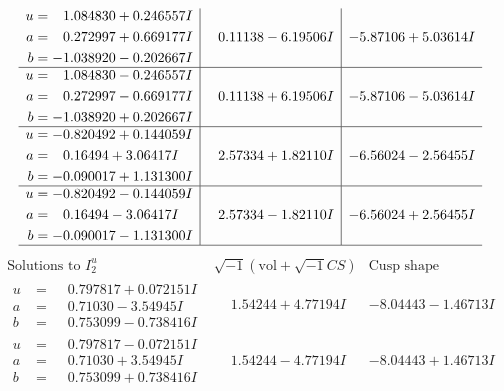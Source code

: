 \documentclass[1p]{elsarticle_modified}
\theoremstyle{definition}
\newcommand{\I}{\sqrt{-1}}
\begin{document}
$$\begin{array}{c|c|c}
\begin{aligned}
u &= \phantom{-}1.084830 + 0.246557 I \\
a &= \phantom{-}0.272997 + 0.669177 I \\
b &= -1.038920 - 0.202667 I\end{aligned}
 & \phantom{-}0.11138 - 6.19506 I & -5.87106 + 5.03614 I \\ \hline\begin{aligned}
u &= \phantom{-}1.084830 - 0.246557 I \\
a &= \phantom{-}0.272997 - 0.669177 I \\
b &= -1.038920 + 0.202667 I\end{aligned}
 & \phantom{-}0.11138 + 6.19506 I & -5.87106 - 5.03614 I \\ \hline\begin{aligned}
u &= -0.820492 + 0.144059 I \\
a &= \phantom{-}0.16494 + 3.06417 I \\
b &= -0.090017 + 1.131300 I\end{aligned}
 & \phantom{-}2.57334 + 1.82110 I & -6.56024 - 2.56455 I \\ \hline\begin{aligned}
u &= -0.820492 - 0.144059 I \\
a &= \phantom{-}0.16494 - 3.06417 I \\
b &= -0.090017 - 1.131300 I\end{aligned}
 & \phantom{-}2.57334 - 1.82110 I & -6.56024 + 2.56455 I\\
 \hline 
 \end{array}$$\newpage$$\begin{array}{c|c|c}  
\text{Solutions to }I^u_{2}& \I (\text{vol} + \sqrt{-1}CS) & \text{Cusp shape}\\
 \hline 
\begin{aligned}
u &= \phantom{-}0.797817 + 0.072151 I \\
a &= \phantom{-}0.71030 - 3.54945 I \\
b &= \phantom{-}0.753099 - 0.738416 I\end{aligned}
 & \phantom{-}1.54244 + 4.77194 I & -8.04443 - 1.46713 I \\ \hline\begin{aligned}
u &= \phantom{-}0.797817 - 0.072151 I \\
a &= \phantom{-}0.71030 + 3.54945 I \\
b &= \phantom{-}0.753099 + 0.738416 I\end{aligned}
 & \phantom{-}1.54244 - 4.77194 I & -8.04443 + 1.46713 I \\ \hline\begin{aligned}

\end{aligned}
\end{array}$$
\end{document}
